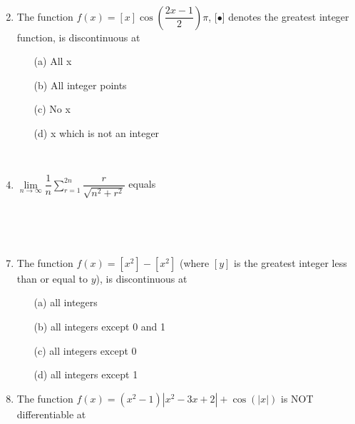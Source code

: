 \begin{enumerate}[label=\arabic*.,ref=\thesubsection.\theenumi]
\item[~] \item The function $f(x)=[x]\cos\left(\dfrac{2x-1}{2}\right)\pi$, [$\bullet$] denotes the greatest integer function, is discontinuous at
\begin{itemize}
\item[(a)] All x \item[(b)] All integer points \item[(c)] No x \item[(d)] x which is not an integer
\end{itemize}

\item[~] \item $\lim\limits_{n \to \infty}\dfrac{1}{n}\sum\limits_{r=1}^{2n}\dfrac{r}{\sqrt{n^2+r^2}}$ equals \item[~] \item[~]
\begin{itemize}
\end{itemize} 

\item The function $f(x)\mathbin{=}[x^2]-[x^2]$ (where $[y]$ is the greatest integer less than or equal to $y$), is discontinuous at
\begin{itemize}
\item[(a)] all integers
\item[(b)] all integers except 0 and 1
\item[(c)] all integers except 0
\item[(d)] all integers except 1
\end{itemize}

\item The function $f(x)\mathbin{=}\left(x^2-1\right)|x^2-3x+2|+\cos\left(|x|\right)$ is NOT differentiable at
\begin{itemize}
\end{itemize}


\end{enumerate}
